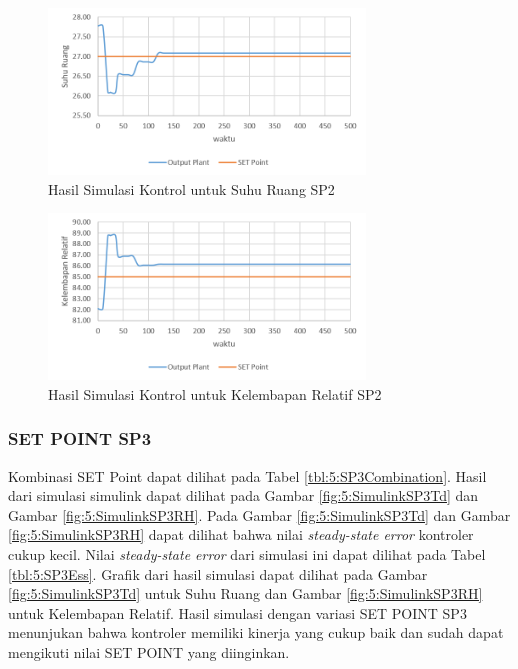 \begin{figure}[!h]
	\centering
	\includegraphics[width=0.75\textwidth]{figures/SimulinkSP2Td}
	\caption{Hasil Simulasi Kontrol untuk Suhu Ruang SP2}
	\label{fig:5:SimulinkSP2Td}
\end{figure}
\vspace{1em}

\begin{figure}[!h]
	\centering
	\includegraphics[width=0.75\textwidth]{figures/SimulinkSP2RH}
	\caption{Hasil Simulasi Kontrol untuk Kelembapan Relatif SP2}
	\label{fig:5:SimulinkSP2RH}
\end{figure}
\vspace{1em}
\break



\subsubsection{SET POINT SP3}

Kombinasi SET Point dapat dilihat pada Tabel \ref{tbl:5:SP3Combination}. Hasil dari simulasi simulink dapat dilihat pada Gambar \ref{fig:5:SimulinkSP3Td} dan Gambar \ref{fig:5:SimulinkSP3RH}. Pada Gambar \ref{fig:5:SimulinkSP3Td} dan Gambar \ref{fig:5:SimulinkSP3RH} dapat dilihat bahwa nilai \textit{steady-state error} kontroler cukup kecil. Nilai \textit{steady-state error} dari simulasi ini dapat dilihat pada Tabel \ref{tbl:5:SP3Ess}. Grafik dari hasil simulasi dapat dilihat pada Gambar \ref{fig:5:SimulinkSP3Td} untuk Suhu Ruang dan Gambar \ref{fig:5:SimulinkSP3RH} untuk Kelembapan Relatif. Hasil simulasi dengan variasi SET POINT SP3 menunjukan bahwa kontroler memiliki kinerja yang cukup baik dan sudah dapat mengikuti nilai SET POINT yang diinginkan.

